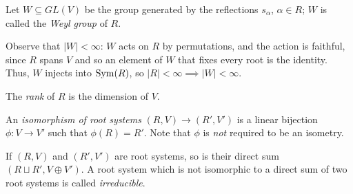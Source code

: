 \begin{definition}
Let $W \subseteq GL(V)$ be the group generated by the reflections $s_\alpha$,
$\alpha \in R$; $W$ is called the \emph{Weyl group} of $R$.
\end{definition}

Observe that $|W| < \infty$: $W$ acts on $R$ by permutations, and the action
is faithful, since $R$ spans $V$ and so an element of $W$ that fixes every root
is the identity. Thus, $W$ injects into $\operatorname{Sym}(R)$, so
$|R| < \infty \implies |W| < \infty$.

\begin{definition}
The \emph{rank} of $R$ is the dimension of $V$.
\end{definition}

\begin{definition}
An \emph{isomorphism of root systems} $(R, V) \to (R', V')$ is a linear
bijection $\phi\colon V \to V'$ such that $\phi(R) = R'$. Note that $\phi$ is
\emph{not} required to be an isometry.
\end{definition}

\begin{definition}
If $(R, V)$ and $(R', V')$ are root systems, so is their direct sum
$(R \sqcup R', V \oplus V')$. A root system which is not isomorphic to a direct
sum of two root systems is called \emph{irreducible}.
\end{definition}

